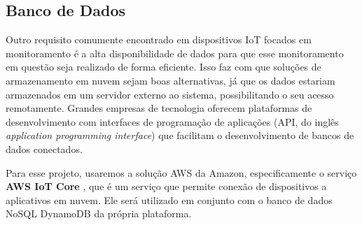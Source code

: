 \documentclass[monografia.tex]{subfiles}
\begin{document}
\subsection{Banco de Dados}
Outro requisito comumente encontrado em dispositivos IoT focados em monitoramento é a alta disponibilidade de dados para que esse monitoramento em questão seja realizado de forma eficiente. Isso faz com que soluções de armazenamento em nuvem sejam boas alternativas, já que os dados estariam armazenados em um servidor externo ao sistema, possibilitando o seu acesso remotamente. Grandes empresas de tecnologia oferecem plataformas de desenvolvimento com interfaces de programação de aplicações (API, do inglês \textit{application programming interface}) que facilitam o desenvolvimento de bancos de dados conectados.

Para esse projeto, usaremos a solução AWS da Amazon, especificamente o serviço \textbf{AWS IoT Core} \cite{aws-iot}, que é um serviço que permite conexão de dispositivos a aplicativos em nuvem. Ele será utilizado em conjunto com o banco de dados NoSQL DynamoDB da própria plataforma.
\end{document}
